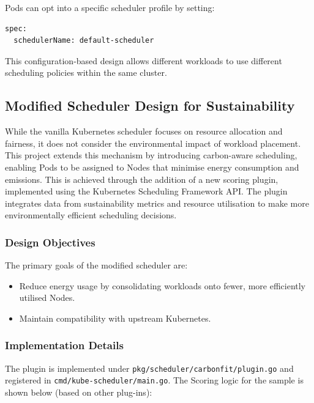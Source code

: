 \documentclass{article}
\begin{document}
Pods can opt into a specific scheduler profile by setting:

\begin{verbatim}
spec:
  schedulerName: default-scheduler
\end{verbatim}

This configuration-based design allows different workloads to use different scheduling policies within the same cluster.

\subsection{Modified Scheduler Design for Sustainability}

While the vanilla Kubernetes scheduler focuses on resource allocation and fairness, it does not consider the environmental impact of workload placement.  
This project extends this mechanism by introducing carbon-aware scheduling, enabling Pods to be assigned to Nodes that minimise energy consumption and emissions.  
This is achieved through the addition of a new scoring plugin, implemented using the Kubernetes Scheduling Framework API.  
The plugin integrates data from sustainability metrics and resource utilisation to make more environmentally efficient scheduling decisions.

\subsubsection{Design Objectives}

The primary goals of the modified scheduler are:
\begin{itemize}
  \item Reduce energy usage by consolidating workloads onto fewer, more efficiently utilised Nodes.
  \item Maintain compatibility with upstream Kubernetes.
\end{itemize}

\subsubsection{Implementation Details}

The plugin is implemented under 
\texttt{pkg/scheduler/carbonfit/plugin.go} and registered in \texttt{cmd/kube-scheduler/main.go}. The
Scoring logic for the sample is shown below (based on other plug-ins):
\end{document}

